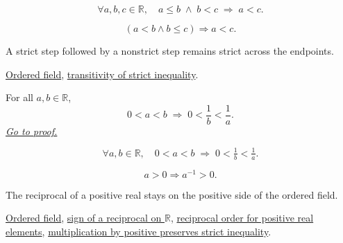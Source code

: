 \begin{remark*}
\[
  \forall a, b, c \in \mathbb{R},\quad
  a \le b \;\land\; b < c \;\Rightarrow\; a < c.
\]
\end{remark*}

\begin{remark*}
\[
(a<b\land b\le c)\Rightarrow a<c.
\]
\end{remark*}

\begin{remark*}[Interpretation]
A strict step followed by a nonstrict step remains strict across the endpoints.
\end{remark*}

\begin{dependencies}
\hyperref[def:real-ordered-field]{Ordered field},
\hyperref[thm:ineq-transitivity-strict]{transitivity of strict inequality}.
\end{dependencies}


\begin{theorem}
\label{thm:ineq-reciprocal-positive}
For all $a, b \in \mathbb{R}$,
\[
  0 < a < b \;\Rightarrow\; 0 < \frac{1}{b} < \frac{1}{a}.
\]
\hyperref[prf:ineq-reciprocal-positive]{\textit{Go to proof.}}
\end{theorem}



\begin{remark*}
\[
  \forall a, b \in \mathbb{R},\quad
  0 < a < b \;\Rightarrow\;
  0 < \tfrac{1}{b} < \tfrac{1}{a}.
\]
\end{remark*}

\begin{remark*}
\[
a>0\Rightarrow a^{-1}>0.
\]
\end{remark*}

\begin{remark*}[Interpretation]
The reciprocal of a positive real stays on the positive side of the ordered field.
\end{remark*}

\begin{dependencies}
\hyperref[def:real-ordered-field]{Ordered field},
\hyperref[thm:sign-of-reciprocal-r]{sign of a reciprocal on $\mathbb{R}$},
\hyperref[thm:reciprocal-reverses-order-on-positives-r]{reciprocal order for positive real elements},
\hyperref[thm:ineq-multiply-positive]{multiplication by positive preserves strict inequality}.
\end{dependencies}

